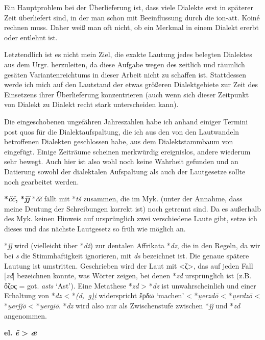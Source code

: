 \documentclass[12pt,a4paper,normalheadings,bibliography=totoc]{scrartcl}
\newcounter{para}
\newcommand{\mypara}[1]{\vspace{1em}\par\noindent\refstepcounter{para}%
\textbf{\textsf{\thepara}}\enspace\textbf{#1}\quad}
\def\rek#1{\mbox{*\textit{#1}}}
\def\bel#1{\mbox{\textit{#1}}}
\def\i#1{\mbox{\textit{#1}}}
\begin{document}
Ein Hauptproblem bei der Überlieferung ist,
dass viele Dialekte erst in späterer Zeit überliefert sind,
in der man schon mit Beeinflussung durch die ion-att. Koiné rechnen muss.
Daher weiß man oft nicht,
ob ein Merkmal in einem Dialekt ererbt oder entlehnt ist.

Letztendlich ist es nicht mein Ziel,
die exakte Lautung jedes belegten Dialektes aus dem Urgr. herzuleiten,
da diese Aufgabe wegen des zeitlich und räumlich gesäten Variantenreichtums
in dieser Arbeit nicht zu schaffen ist.
Stattdessen werde ich mich auf den Lautstand der etwas größeren Dialektgebiete
zur Zeit des Einsetzens ihrer Überlieferung konzentrieren
(auch wenn sich dieser Zeitpunkt von Dialekt zu Dialekt recht stark unterscheiden kann).

Die eingeschobenen ungefähren Jahreszahlen habe ich anhand einiger Termini
post quos für die Dialektaufspaltung,
die ich aus den von den Lautwandeln betroffenen Dialekten geschlossen habe,
aus dem Dialektstammbaum von \textcite{bart_frueh} eingefügt.
Einige Zeiträume scheinen merkwürdig ereignislos, andere wiederum sehr bewegt.
Auch hier ist also wohl noch keine Wahrheit gefunden und
an Datierung sowohl der dialektalen Aufspaltung als auch der Lautgesetze
sollte noch gearbeitet werden.

\mypara{\rek{čč}, \rek{ǰǰ}}
\label{dz}
\rek{čč} fällt mit \rek{tš} zusammen,
die im Myk. (unter der Annahme, dass meine Deutung der Schreibungen korrekt ist) noch getrennt sind.
Da es außerhalb des Myk. keinen Hinweis auf ursprünglich zwei verschiedene
Laute gibt,
setze ich dieses und das nächste Lautgesetz so früh wie möglich an.

\lex{\i{čč}}{\i{tš}}

\bigskip\noindent
\rek{ǰǰ} wird (vielleicht über \rek{dž}) zur dentalen Affrikata \rek{dz},
die in den Regeln, da wir bei \bel{s} die Stimmhaftigkeit ignorieren,
mit \bel{ds} bezeichnet ist.
Die genaue spätere Lautung ist umstritten.
Geschrieben wird der Laut mit <ζ>,
das auf jeden Fall [\bel{zd}] bezeichnen konnte,
was Wörter zeigen, bei denen \rek{zd} ursprünglich ist
(z.B. ὄζος = got. \bel{asts} `Ast').
Eine Metathese \rek{zd} > \rek{dz} ist unwahrscheinlich
und einer Erhaltung von \rek{dz} < \rek{(d, g)i̯} widerspricht
ἔρδω `machen' < \rek{u̯erzdō} < \rek{u̯erdzō} < \rek{u̯erǰǰō} < \rek{u̯ergi̯ō}.
\rek{dz} wird also nur als Zwischenstufe zwischen \rek{ǰǰ} und \rek{zd}
angenommen.

\lex{\i{ǰǰ}}{\i{ds}}

\mypara{el. \bel{ē} > \bel{ǣ}}
\end{document}

